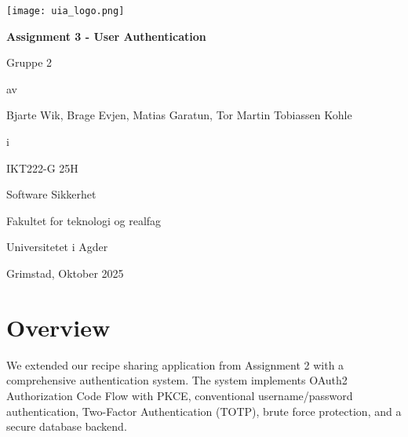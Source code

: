 \documentclass[12pt,a4paper]{article}
\begin{document}
\begin{titlepage}
    \centering
    \vspace*{1cm}

    \texttt{[image: uia\_logo.png]}

    \vspace{1.5cm}

    {\Huge\bfseries Assignment 3 - User Authentication\par}

    \vspace{1cm}

    {\Large Gruppe 2\par}

    \vspace{0.5cm}

    {\large av\par}

    \vspace{0.5cm}

    {\large Bjarte Wik, Brage Evjen, Matias Garatun, Tor Martin Tobiassen Kohle\par}

    \vspace{1cm}

    {\large i\par}

    \vspace{0.5cm}

    {\large IKT222-G 25H\par}
    {\large Software Sikkerhet\par}

    \vspace{1.5cm}

    {\large Fakultet for teknologi og realfag\par}
    {\large Universitetet i Agder\par}

    \vfill

    {\large Grimstad, Oktober 2025\par}

\end{titlepage}

\tableofcontents
\newpage

\section{Overview}

We extended our recipe sharing application from Assignment 2 with a comprehensive authentication system. The system implements OAuth2 Authorization Code Flow with PKCE, conventional username/password authentication, Two-Factor Authentication (TOTP), brute force protection, and a secure database backend.
\end{document}
